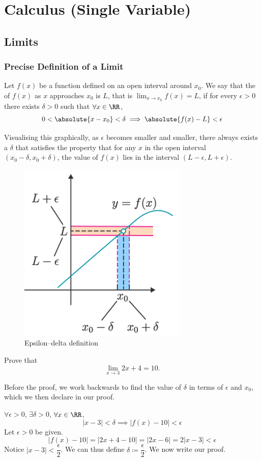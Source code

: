 \part{Calculus (Single Variable)}
\chapter{Limits}
\section{Precise Definition of a Limit}
\begin{definition}
Let $f(x)$ be a function defined on an open interval around $x_0$. We say that the  of $f(x)$ as $x$ approaches $x_0$ is $L$, that is $\displaystyle\lim_{x \to x_0}f(x)=L$, if for every $\epsilon>0$ there exists $\delta > 0$ such that $\forall x \in \RR$, 
\[ 0<\absolute{x-x_0}<\delta \implies \absolute{f(x)-L}<\epsilon \] 
\end{definition} 

Visualising this graphically, as $\epsilon$ becomes smaller and smaller, there always exists a $\delta$ that satisfies the property that for any $x$ in the open interval $(x_0-\delta,x_0+\delta)$, the value of $f(x)$ lies in the interval $(L-\epsilon, L+\epsilon)$.

\begin{figure}[H]
	\centering
	\includegraphics[width=0.3\linewidth]{images/Epsilon_delta_definition.png}
    \caption{Epsilon--delta definition}
\end{figure}

\begin{exercise} 
Prove that \[ \lim_{x\to3}2x+4=10. \]
\end{exercise}

Before the proof, we work backwards to find the value of $\delta$ in terms of $\epsilon$ and $x_0$, which we then declare in our proof.

$\forall \epsilon > 0$, $\exists \delta > 0$, $\forall x \in \RR$,
\[ |x-3| < \delta \implies |f(x)-10| < \epsilon \]
Let $\epsilon > 0$ be given.
\[ |f(x)-10| = |2x+4-10| = |2x-6| = 2|x-3| < \epsilon \]
Notice $|x-3| < \dfrac{\epsilon}{2}$. We can thus define $\delta \coloneqq \dfrac{\epsilon}{2}$. We now write our proof.

